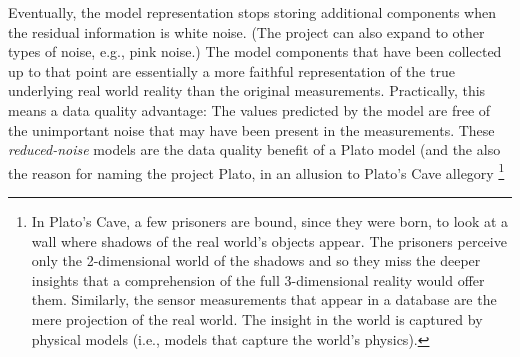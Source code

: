 Eventually, the model representation stops storing additional components when the residual information is white noise. (The project can also expand to other types of noise, e.g., pink noise.) The model components that have been collected up to that point are essentially a more faithful representation of the true underlying real world reality than the original measurements. Practically, this means a data quality advantage: The values predicted by the model are free of the unimportant noise that may have been present in the measurements. These {\em reduced-noise} models are the data quality benefit of a Plato model (and the also the reason for naming the project Plato, in an allusion to Plato's Cave allegory%
\footnote{In Plato's Cave, a few prisoners are bound, since they were born, to look at a wall where shadows of the real world's objects appear. The prisoners perceive only the 2-dimensional world of the shadows and so they miss the deeper insights that a comprehension of the full 3-dimensional reality would offer them. Similarly, the sensor measurements that appear in a database are the mere projection of the real world. The insight in the world is captured by physical models (i.e., models that capture the world's physics). 
}







